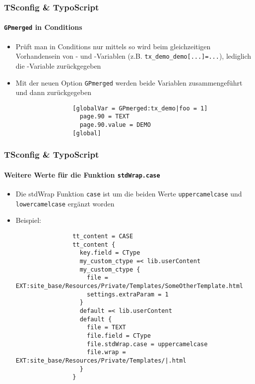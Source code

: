 \begin{frame}[fragile]
	\frametitle{TSconfig \& TypoScript}
	\framesubtitle{\texttt{GPmerged} in Conditions}

	\begin{itemize}

		\item Prüft man in Conditions nur mittels  so wird beim
			gleichzeitigen Vorhandensein von - und -Variablen
			(z.B. \texttt{tx\_demo\_demo[...]=...}), lediglich die
			-Variable zurückgegeben

		\item Mit der neuen Option \texttt{GPmerged} werden beide Variablen
			zusammengeführt und dann zurückgegeben

			\begin{lstlisting}
				[globalVar = GPmerged:tx_demo|foo = 1]
				  page.90 = TEXT
				  page.90.value = DEMO
				[global]
			\end{lstlisting}

	\end{itemize}

\end{frame}


\begin{frame}[fragile]
	\frametitle{TSconfig \& TypoScript}
	\framesubtitle{Weitere Werte für die Funktion \texttt{stdWrap.case}}

	\lstset{basicstyle=\tiny\ttfamily}

	\begin{itemize}

		\item Die stdWrap Funktion \texttt{case} ist um die beiden Werte
			\texttt{uppercamelcase} und \texttt{lowercamelcase} ergänzt worden

		\item Beispiel:

			\begin{lstlisting}
				tt_content = CASE
				tt_content {
				  key.field = CType
				  my_custom_ctype =< lib.userContent
				  my_custom_ctype {
				    file = EXT:site_base/Resources/Private/Templates/SomeOtherTemplate.html
				    settings.extraParam = 1
				  }
				  default =< lib.userContent
				  default {
				    file = TEXT
				    file.field = CType
				    file.stdWrap.case = uppercamelcase
				    file.wrap = EXT:site_base/Resources/Private/Templates/|.html
				  }
				}
			\end{lstlisting}

	\end{itemize}

\end{frame}

